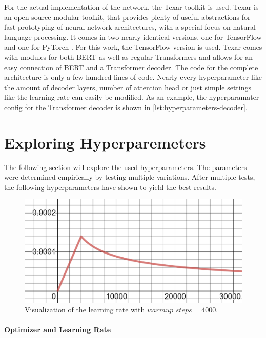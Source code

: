 For the actual implementation of the network, the Texar toolkit \cite{hu2019texar} is used.
Texar is an open-source modular toolkit, that provides plenty of useful abstractions for fast prototyping of neural network architectures, with a special focus on natural language processing.
It comes in two nearly identical versions, one for TensorFlow \cite{tensorflow2015-whitepaper} and one for PyTorch \cite{NEURIPS2019_9015}.  
For this work, the TensorFlow version is used.
Texar comes with modules for both BERT as well as regular Transformers and allows for an easy connection of BERT and a Transformer decoder.
The code for the complete architecture is only a few hundred lines of code.
Nearly every hyperparameter like the amount of decoder layers, number of attention head or just simple settings like the learning rate can easily be modified.
As an example, the hyperparamater config for the Transformer decoder is shown in \cref{lst:hyperparameters-decoder}.


\section{Exploring Hyperparemeters}

The following section will explore the used hyperparameters.
The parameters were determined empirically by testing multiple variations.
After multiple tests, the following hyperparameters have shown to yield the best results.

\begin{figure}[h]
\centering
\includegraphics[width=0.6\paperwidth]{figures/learning-rate}
\caption{Visualization of the learning rate with $warmup\_steps = 4000$.}
\label{fig:learning-rate}
\end{figure}

\paragraph{Optimizer and Learning Rate}

